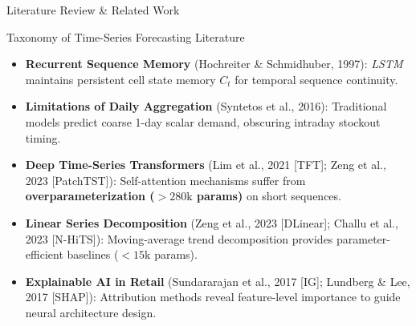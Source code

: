 \documentclass[10pt, aspectratio=169]{beamer}
\begin{document}
\begin{frame}{Literature Review \& Related Work}
  \begin{block}{Taxonomy of Time-Series Forecasting Literature}
    \begin{itemize}
      \item \textbf{Recurrent Sequence Memory} (Hochreiter \& Schmidhuber, 1997):
        \textit{LSTM} maintains persistent cell state memory $C_t$ for temporal sequence continuity.
      \item \textbf{Limitations of Daily Aggregation} (Syntetos et al., 2016):
        Traditional models predict coarse 1-day scalar demand, obscuring intraday stockout timing.
      \item \textbf{Deep Time-Series Transformers} (Lim et al., 2021 [TFT]; Zeng et al., 2023 [PatchTST]):
        Self-attention mechanisms suffer from \textbf{overparameterization ($>280\text{k}$ params)} on short sequences.
      \item \textbf{Linear Series Decomposition} (Zeng et al., 2023 [DLinear]; Challu et al., 2023 [N-HiTS]):
        Moving-average trend decomposition provides parameter-efficient baselines ($<15\text{k}$ params).
      \item \textbf{Explainable AI in Retail} (Sundararajan et al., 2017 [IG]; Lundberg \& Lee, 2017 [SHAP]):
        Attribution methods reveal feature-level importance to guide neural architecture design.
    \end{itemize}
  \end{block}
\end{frame}
\end{document}
